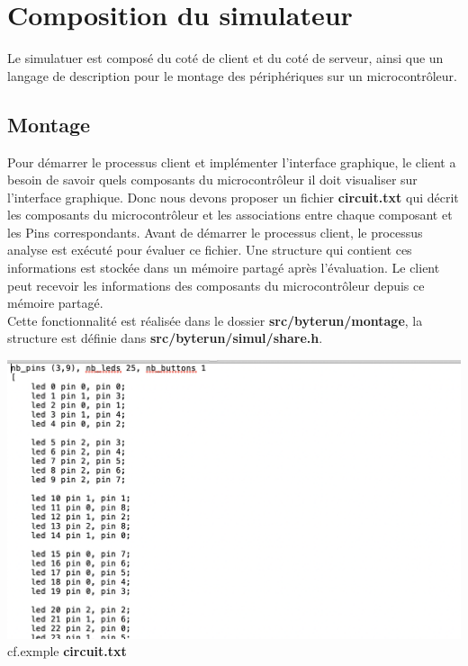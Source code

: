 \documentclass[14px]{article}
\begin{document}
\clearpage
\pagestyle{fancy}
\rhead{\thepage}
\fancyfoot{}
\section{Composition du simulateur}
Le simulatuer est composé du coté de client et du coté de serveur, ainsi que un langage de description pour le montage des périphériques sur un microcontrôleur.

\subsection{Montage}
Pour démarrer le processus client et implémenter l'interface graphique, le client a besoin de savoir quels composants du microcontrôleur il doit visualiser sur l'interface graphique. Donc
nous devons proposer un fichier \textbf{circuit.txt} qui décrit les composants du microcontrôleur et les associations entre chaque composant et les Pins correspondants. Avant de démarrer le processus client, le processus analyse est exécuté pour évaluer ce fichier. Une structure qui contient ces informations est stockée dans un mémoire partagé après l'évaluation. Le client peut recevoir les informations des composants du microcontrôleur depuis ce mémoire partagé.\\
Cette fonctionnalité est réalisée dans le dossier \textbf{src/byterun/montage}, la structure est définie dans \textbf{src/byterun/simul/share.h}.

\includegraphics[width=\textwidth]{exempleCircuit.png}\\[1cm]

cf.exmple  \textbf{circuit.txt}
\end{document}
